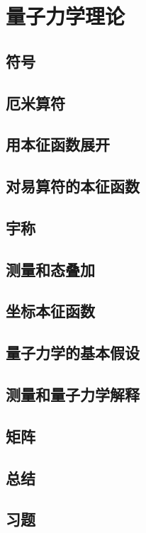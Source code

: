 \chapter{量子力学理论}
\label{chap:7}
\section{符号}
\label{sec:7.1 Notation}

\section{厄米算符}
\label{sec:7.2 Hermitian Operators}

\section{用本征函数展开}
\label{sec:7.3 Expansion in Terms of Eigenfunctions}

\section{对易算符的本征函数}
\label{sec:7.4 Eigenfunctions of Commuting Operators}

\section{宇称}
\label{sec:7.5 Parity}

\section{测量和态叠加}
\label{sec:7.6 Measurement and the Superposition of States}

\section{坐标本征函数}
\label{sec:7.7 Position Eigenfunctions}

\section{量子力学的基本假设}
\label{sec:7.8 The Postulates of Quantum Mechanics}

\section{测量和量子力学解释}
\label{sec:7.9 Measurement and the Interpretation of Quantum Mechanics}

\section{矩阵}
\label{sec:7.10 Matrices}

\section*{总结}

\section*{习题}